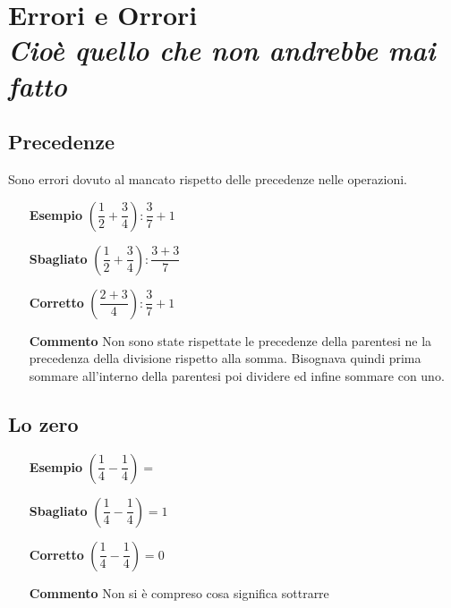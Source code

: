 \chapter[Errori ed orrori]
{Errori e Orrori\\[.5ex]
	\normalsize\textit{Cioè quello che non andrebbe mai fatto}}
	\label{cha:orrorieerroriraz}
	\minitoc
	\mtcskip                                %
	\minilof                                %
	\mtcskip                                %
	\minilot
	\section{Precedenze}
	\label{sec:precedenze}
	Sono errori dovuto al  mancato rispetto delle precedenze nelle operazioni.
	
	\begin{itemize}
		\item [\textbf{Esempio}]$(\dfrac{1}{2 }+\dfrac{3}{4}):\dfrac{3}{7}+1$
		\item [\textbf{Sbagliato}]$(\dfrac{1}{2 }+\dfrac{3}{4}):\dfrac{3+3}{7}$
		\item [\textbf{Corretto}]$(\dfrac{2+3}{4}):\dfrac{3}{7}+1$
		\item [\textbf{Commento}]Non sono state rispettate le precedenze della parentesi ne la precedenza della divisione rispetto alla somma. Bisognava quindi prima sommare all'interno della parentesi poi dividere ed infine sommare con uno.
	\end{itemize}
	\section{Lo zero}
	\label{sec:lozero}
	\begin{itemize}
		\item [\textbf{Esempio}]$(\dfrac{1}{4 }-\dfrac{1}{4})=$
		\item [\textbf{Sbagliato}]$(\dfrac{1}{4 }-\dfrac{1}{4})=1$
		\item [\textbf{Corretto}]$(\dfrac{1}{4 }-\dfrac{1}{4})=0$
		\item [\textbf{Commento}] Non si è compreso cosa significa sottrarre 
	\end{itemize}